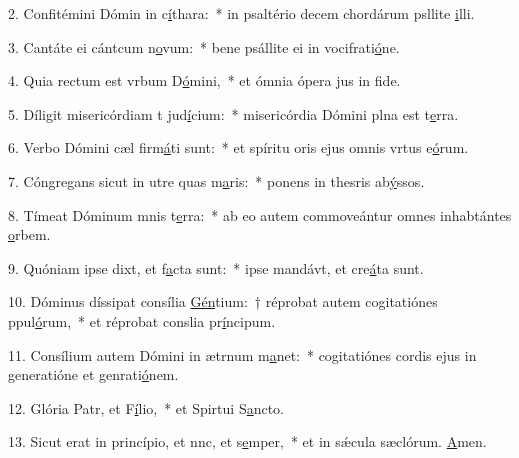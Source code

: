 2. Confitémini Dómin in c\uline{í}thara:~* in psaltério decem chordárum psllite \uline{i}lli.\par 
3. Cantáte ei cántcum n\uline{o}vum:~* bene psállite ei in vocifrati\uline{ó}ne.\par 
4. Quia rectum est vrbum D\uline{ó}mini,~* et ómnia ópera jus in f\uline{i}de.\par 
5. Díligit misericórdiam t jud\uline{í}cium:~* misericórdia Dómini plna est t\uline{e}rra.\par 
6. Verbo Dómini cæl firm\uline{á}ti sunt:~* et spíritu oris ejus omnis vrtus e\uline{ó}rum.\par 
7. Cóngregans sicut in utre quas m\uline{a}ris:~* ponens in thesris ab\uline{ý}ssos.\par 
8. Tímeat Dóminum mnis t\uline{e}rra:~* ab eo autem commoveántur omnes inhabtántes \uline{o}rbem.\par 
9. Quóniam ipse dixt, et f\uline{a}cta sunt:~* ipse mandávt, et cre\uline{á}ta sunt.\par 
10. Dóminus díssipat consília \uline{Gén}tium:~† réprobat autem cogitatiónes ppul\uline{ó}rum,~* et réprobat conslia pr\uline{í}ncipum.\par 
11. Consílium autem Dómini in ætrnum m\uline{a}net:~* cogitatiónes cordis ejus in generatióne et genrati\uline{ó}nem.\par 
12. Glória Patr, et F\uline{í}lio,~* et Spirtui S\uline{a}ncto.\par 
13. Sicut erat in princípio, et nnc, et s\uline{e}mper,~* et in sǽcula sæclórum. \uline{A}men.\par 
